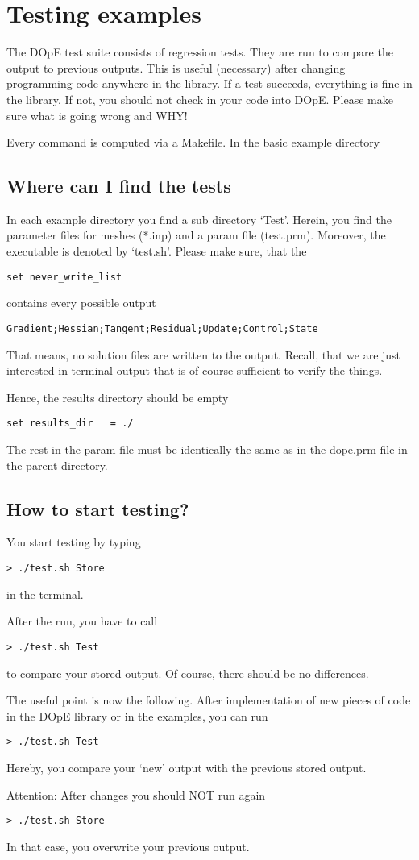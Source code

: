 \chapter{Testing examples}\label{chap:test}
The DOpE test suite consists of regression tests. They are run to compare 
the output to previous outputs. This is useful (necessary) after 
changing programming code anywhere in the library. If a test
succeeds, everything is fine in the library. If not, you should not
check in your code into DOpE. Please make sure what is going wrong and WHY!

Every command is computed via a Makefile. In the basic example 
directory

\section{Where can I find the tests}
In each example directory you find a sub directory `Test'. Herein, you find 
the parameter files for meshes (*.inp) and a param file (test.prm).
Moreover, the executable is denoted by `test.sh'. Please make sure, that 
the 
\begin{verbatim}
set never_write_list
\end{verbatim}
contains every possible output
\begin{verbatim}
Gradient;Hessian;Tangent;Residual;Update;Control;State
\end{verbatim}
That means, no solution files are written to the output.
Recall, that we are just interested in terminal output that 
is of course sufficient to verify the things.

Hence, the results directory should be empty
\begin{verbatim}
set results_dir   = ./
\end{verbatim}
The rest in the param file must be identically the same as 
in the dope.prm file in the parent directory. 

\section{How to start testing?}
You start testing by typing 
\begin{verbatim}
> ./test.sh Store
\end{verbatim}
in the terminal.

After the run, you have to call 
\begin{verbatim}
> ./test.sh Test
\end{verbatim}
to compare your stored output. Of course, there should be no differences.

The useful point is now the following. After implementation of 
new pieces of code in the DOpE library or in the examples, you can
run 
\begin{verbatim}
> ./test.sh Test
\end{verbatim}
Hereby, you compare your `new' output with the previous stored output.

Attention: After changes you should NOT run again
\begin{verbatim}
> ./test.sh Store
\end{verbatim}
In that case, you overwrite your previous output.